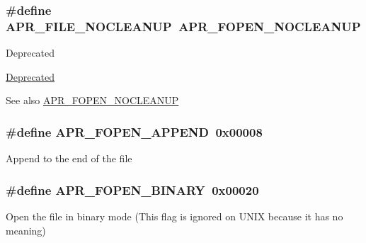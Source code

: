 \subsubsection[{\texorpdfstring{A\+P\+R\+\_\+\+F\+I\+L\+E\+\_\+\+N\+O\+C\+L\+E\+A\+N\+UP}{APR_FILE_NOCLEANUP}}]{\setlength{\rightskip}{0pt plus 5cm}\#define A\+P\+R\+\_\+\+F\+I\+L\+E\+\_\+\+N\+O\+C\+L\+E\+A\+N\+UP~{\bf A\+P\+R\+\_\+\+F\+O\+P\+E\+N\+\_\+\+N\+O\+C\+L\+E\+A\+N\+UP}}\hypertarget{group__apr__file__open__flags_ga3ef1061dbb3adf595701bd12edb062f9}{}\label{group__apr__file__open__flags_ga3ef1061dbb3adf595701bd12edb062f9}
\begin{DoxyRefDesc}{Deprecated}
\item[\hyperlink{deprecated__deprecated000035}{Deprecated}]\end{DoxyRefDesc}
\begin{DoxySeeAlso}{See also}
\hyperlink{group__apr__file__open__flags_ga3fc9b5a7791d9f462997cd29de67eb80}{A\+P\+R\+\_\+\+F\+O\+P\+E\+N\+\_\+\+N\+O\+C\+L\+E\+A\+N\+UP} 
\end{DoxySeeAlso}
\subsubsection[{\texorpdfstring{A\+P\+R\+\_\+\+F\+O\+P\+E\+N\+\_\+\+A\+P\+P\+E\+ND}{APR_FOPEN_APPEND}}]{\setlength{\rightskip}{0pt plus 5cm}\#define A\+P\+R\+\_\+\+F\+O\+P\+E\+N\+\_\+\+A\+P\+P\+E\+ND~0x00008}\hypertarget{group__apr__file__open__flags_ga45f353db9b71d4760a3f35cf3781cfc8}{}\label{group__apr__file__open__flags_ga45f353db9b71d4760a3f35cf3781cfc8}
Append to the end of the file 
\subsubsection[{\texorpdfstring{A\+P\+R\+\_\+\+F\+O\+P\+E\+N\+\_\+\+B\+I\+N\+A\+RY}{APR_FOPEN_BINARY}}]{\setlength{\rightskip}{0pt plus 5cm}\#define A\+P\+R\+\_\+\+F\+O\+P\+E\+N\+\_\+\+B\+I\+N\+A\+RY~0x00020}\hypertarget{group__apr__file__open__flags_gacb20b3028864f34cb26314fe2cacc3fa}{}\label{group__apr__file__open__flags_gacb20b3028864f34cb26314fe2cacc3fa}
Open the file in binary mode (This flag is ignored on U\+N\+IX because it has no meaning) 

